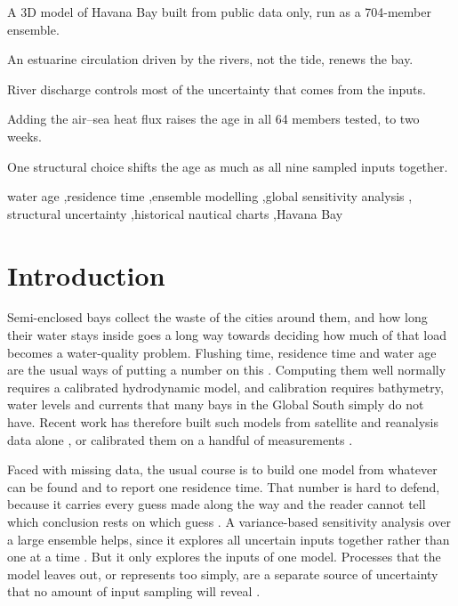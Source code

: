 \documentclass[a4paper,fleqn]{ems-dc}
\begin{document}
\begin{highlights}
\item A 3D model of Havana Bay built from public data only, run as a 704-member ensemble.
\item An estuarine circulation driven by the rivers, not the tide, renews the bay.
\item River discharge controls most of the uncertainty that comes from the inputs.
\item Adding the air--sea heat flux raises the age in all 64 members tested, to two weeks.
\item One structural choice shifts the age as much as all nine sampled inputs together.
\end{highlights}

\begin{keywords}
water age \sep residence time \sep ensemble modelling \sep global sensitivity analysis \sep
structural uncertainty \sep historical nautical charts \sep Havana Bay
\end{keywords}

\maketitle

\section{Introduction}\label{sec:intro}
Semi-enclosed bays collect the waste of the cities around them, and how long their water
stays inside goes a long way towards deciding how much of that load becomes a water-quality
problem. Flushing time, residence time and water age are the usual ways of putting a number
on this \citep{Monsen2002,Deleersnijder2001,Lucas2020}. Computing them well normally
requires a calibrated hydrodynamic model, and calibration requires bathymetry, water levels
and currents that many bays in the Global South simply do not have. Recent work has
therefore built such models from satellite and reanalysis data alone \citep{Payandeh2026},
or calibrated them on a handful of measurements \citep{RodriguesDoAmaral2025}.

Faced with missing data, the usual course is to build one model from whatever can be found
and to report one residence time. That number is hard to defend, because it carries every
guess made along the way and the reader cannot tell which conclusion rests on which guess
\citep{Uusitalo2015}. A variance-based sensitivity analysis over a large ensemble
\citep{Sobol2001,Saltelli2008,Saltelli2010} helps, since it explores all uncertain inputs
together rather than one at a time \citep{Saltelli2019,Pianosi2016,Razavi2021}. But it only
explores the inputs of one model. Processes that the model leaves out, or represents too
simply, are a separate source of uncertainty that no amount of input sampling will reveal
\citep{Walker2003,Refsgaard2006,Gupta2012}.
\end{document}
